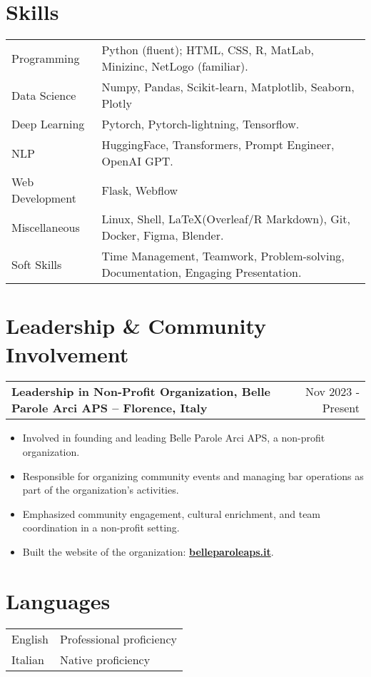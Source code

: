 \documentclass[a4paper,12pt]{article}
\makeatletter
\newenvironment{joblong}[2]
    {
    \begin{tabularx}{\linewidth}{@{}l X r@{}}
    \textbf{#1} & \hfill &  #2 \\[3.75pt]
    \end{tabularx}
    \begin{minipage}[t]{\linewidth}
    \begin{itemize}[nosep,after=\strut, leftmargin=1em, itemsep=3pt,label=--]
    }
    {
    \end{itemize}
    \end{minipage}    
    }
\makeatother
\begin{document}
\section{Skills}
\begin{tabularx}{\linewidth}{@{}l X@{}}
Programming &  \normalsize{Python (fluent); HTML, CSS, R, MatLab, Minizinc, NetLogo (familiar).}\\
Data Science  &  \normalsize{Numpy, Pandas, Scikit-learn, Matplotlib, Seaborn, Plotly}\\  
Deep Learning  &  \normalsize{Pytorch, Pytorch-lightning, Tensorflow.}\\  
NLP  &  \normalsize{HuggingFace, Transformers, Prompt Engineer, OpenAI GPT.}\\  
Web Development  &  \normalsize{Flask, Webflow}\\  
Miscellaneous  &  \normalsize{Linux, Shell, \LaTeX (Overleaf/R Markdown), Git, Docker, Figma, Blender.}\\  
Soft Skills  &  \normalsize{Time Management, Teamwork, Problem-solving, Documentation, Engaging Presentation.}\\  
\end{tabularx}

\section{Leadership \& Community Involvement}

\begin{joblong}{Leadership in Non-Profit Organization, Belle Parole Arci APS -- Florence, Italy}{Nov 2023 - Present}
\item Involved in founding and leading Belle Parole Arci APS, a non-profit organization.
\item Responsible for organizing community events and managing bar operations as part of the organization's activities.
\item Emphasized community engagement, cultural enrichment, and team coordination in a non-profit setting.
\item Built the website of the organization: \href{http://belleparoleaps.it}{\textbf{belleparoleaps.it}}.
\end{joblong}

\section{Languages}
\begin{tabularx}{\linewidth}{@{}l X@{}}
English &  \normalsize{Professional proficiency}\\
Italian  &  \normalsize{Native proficiency}\\  
\end{tabularx}

\vfill
{}
\end{document}
